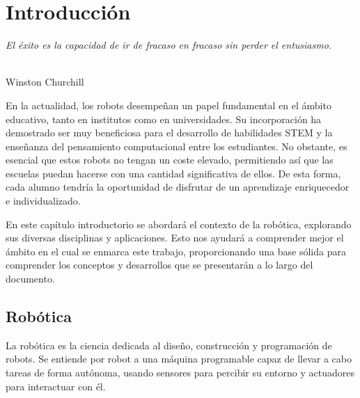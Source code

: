 \chapter{Introducción}
\label{cap:capitulo1}
\setcounter{page}{1}

\begin{flushright}
\begin{minipage}[]{10cm}
\emph{El éxito es la capacidad de ir de fracaso en fracaso sin perder el entusiasmo.}\\
\end{minipage}\\

Winston Churchill\\
\end{flushright}
\vspace{2cm}
\noindent En la actualidad, los robots desempeñan un papel fundamental en el ámbito educativo, tanto en institutos como en universidades. Su 
incorporación ha demostrado ser muy beneficiosa para el desarrollo de habilidades \acs{STEM} y la enseñanza del pensamiento computacional 
entre los estudiantes. No obstante, es esencial que estos robots no tengan un coste elevado, permitiendo así que las escuelas puedan hacerse 
con una cantidad significativa de ellos. De esta forma, cada alumno tendría la oportunidad de disfrutar de un aprendizaje enriquecedor e individualizado.

En este capítulo introductorio se abordará el contexto de la robótica, explorando sus diversas disciplinas y aplicaciones. Esto nos ayudará a 
comprender mejor el ámbito en el cual se enmarca este trabajo, proporcionando una base sólida para comprender los conceptos y desarrollos que 
se presentarán a lo largo del documento.

\section{Robótica}
\label{sec:rob}
\noindent La robótica es la ciencia dedicada al diseño, construcción y programación de robots. Se entiende por 
robot a una máquina programable capaz de llevar a cabo tareas de forma autónoma, usando sensores para percibir su entorno y 
actuadores para interactuar con él.


